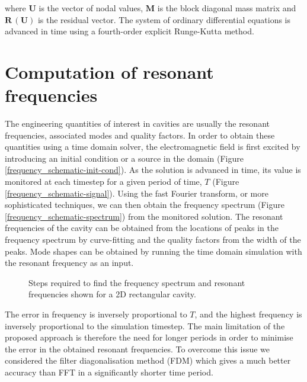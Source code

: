 \documentclass[times,11pt]{ACME2015article}
\newcommand{\mb}{\mathbf}
\begin{document}
where $\boldsymbol{U}$ is the vector of nodal values, $\mb{M}$ is the block diagonal mass matrix and $\mb{R}\,(\boldsymbol{U})$ is the residual vector. The system of ordinary differential equations is advanced in time using a fourth-order explicit Runge-Kutta method.

\section{Computation of resonant frequencies}

The engineering quantities of interest in cavities are usually the resonant frequencies, associated modes and quality factors. In order to obtain these quantities using a time domain solver, the electromagnetic field is first excited by introducing an initial condition or a source in the domain (Figure \ref{frequency_schematic-init-cond}). As the solution is advanced in time, its value is monitored at each timestep for a given period of time, $T$ (Figure \ref{frequency_schematic-signal}). Using the fast Fourier transform, or more sophisticated techniques, we can then obtain the frequency spectrum (Figure \ref{frequency_schematic-spectrum}) from the monitored solution. The resonant frequencies of the cavity can be obtained from the locations of peaks in the frequency spectrum by curve-fitting and the quality factors from the width of the peaks. Mode shapes can be obtained by running the time domain simulation with the resonant frequency as an input.

\begin{figure}[htbp!]
 \centering
  
\caption{Steps required to find the frequency spectrum and resonant frequencies shown for a 2D rectangular cavity.}
\end{figure}

The error in frequency is inversely proportional to $T$, and the highest frequency is inversely proportional to the simulation timestep. The main limitation of the proposed approach is therefore the need for longer periods in order to minimise the error in the obtained resonant frequencies. To overcome this issue we considered the filter diagonalisation method \cite{Mandelshtam1997} (FDM) which gives a much better accuracy than FFT in a significantly shorter time period. %
\end{document}
